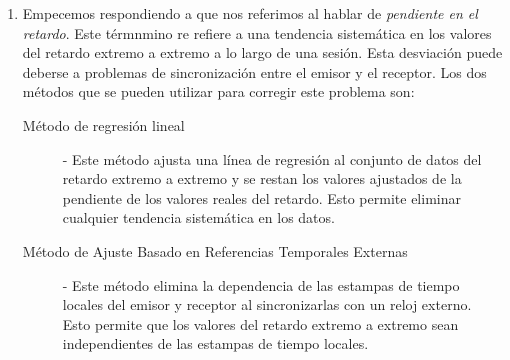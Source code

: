 \begin{enumerate}
  \item Empecemos respondiendo a que nos referimos al hablar de \textit{pendiente en el retardo}. Este t\'ermnmino re refiere a una tendencia
  sistem\'atica en los valores del retardo extremo a extremo a lo largo de una sesi\'on. Esta desviaci\'on puede deberse a problemas de sincronizaci\'on
  entre el emisor y el receptor. Los dos métodos que se pueden utilizar para corregir este problema son:
  \begin{description}
    \item[M\'etodo de regresi\'on lineal] - Este m\'etodo ajusta una l\'inea de regresi\'on al conjunto de datos del retardo extremo a extremo y se restan
    los valores ajustados de la pendiente de los valores reales del retardo. Esto permite eliminar cualquier tendencia sistem\'atica en los datos.
    \item[M\'etodo de Ajuste Basado en Referencias Temporales Externas] - Este m\'etodo elimina la dependencia de las estampas de tiempo locales del emisor
    y receptor al sincronizarlas con un reloj externo. Esto permite que los valores del retardo extremo a extremo sean independientes de las estampas de tiempo locales.
  \end{description} 
\end{enumerate}